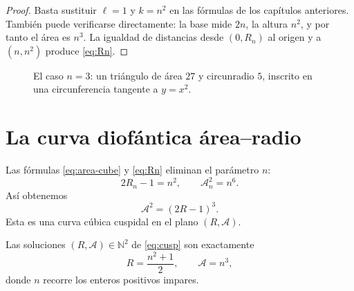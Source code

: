 \documentclass[11pt,a4paper,openany]{report}
\newcommand{\N}{\mathbb{N}}
\newcommand{\Area}{\mathcal{A}}
\begin{document}
\begin{proof}
Basta sustituir \(\ell=1\) y \(k=n^2\) en las fórmulas de los capítulos anteriores. También puede verificarse directamente: la base mide \(2n\), la altura \(n^2\), y por tanto el área es \(n^3\). La igualdad de distancias desde \((0,R_n)\) al origen y a \((n,n^2)\) produce \eqref{eq:Rn}.
\end{proof}

\begin{figure}[H]
\centering
{}
\caption{El caso \(n=3\): un triángulo de área \(27\) y circunradio \(5\), inscrito en una circunferencia tangente a \(y=x^2\).}
\label{fig:n3}
\end{figure}

\section{La curva diofántica área--radio}

Las fórmulas \eqref{eq:area-cube} y \eqref{eq:Rn} eliminan el parámetro \(n\):
\[
 2R_n-1=n^2,
 \qquad
 \Area_n^2=n^6.
\]
Así obtenemos
\begin{equation}
 \boxed{\Area^2=(2R-1)^3.}
 \label{eq:cusp}
\end{equation}
Esta es una curva cúbica cuspidal en el plano \((R,\Area)\).

\begin{theorem}
Las soluciones \((R,\Area)\in\N^2\) de \eqref{eq:cusp} son exactamente
\[
 R=\frac{n^2+1}{2},\qquad \Area=n^3,
\]
donde \(n\) recorre los enteros positivos impares.
\end{theorem}
\end{document}
